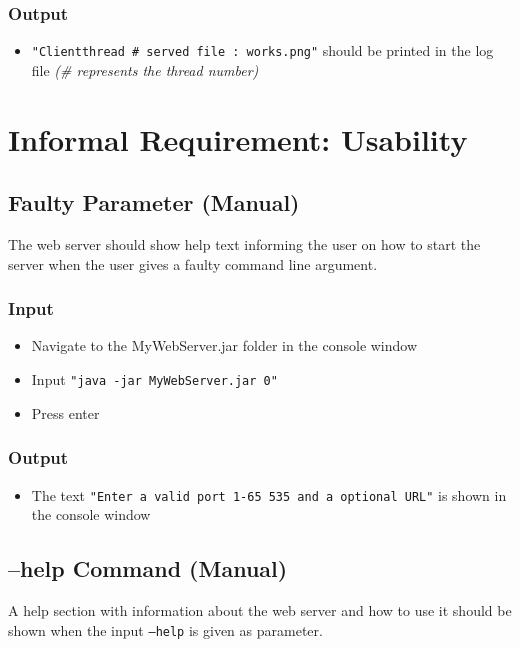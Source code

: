 \documentclass[a4paper, 12pt]{article}
\begin{document}
\subsubsection{Output}
\begin{itemize}
\item \texttt{"Clientthread \# served file : works.png"} should be printed in the log file \textit{(\# represents the thread number)}
\end{itemize}

\newpage
\section{Informal Requirement: Usability}

\subsection{Faulty Parameter (Manual)}

The web server should show help text informing the user on how to start the server when the user gives a faulty command line argument. 

\subsubsection{Input}
\begin{itemize}
\item Navigate to the MyWebServer.jar folder in the console window
\item Input \texttt{"java -jar MyWebServer.jar 0"}
\item Press enter
\end{itemize} 

\subsubsection{Output} 
\begin{itemize}
\item The text \texttt{"Enter a valid port 1-65 535 and a optional URL"} is shown in the console window
\end{itemize}

\subsection{--help Command (Manual)}

A help section with information about the web server and how to use it should be shown when the input \texttt{--help} is given as parameter.
\end{document}
